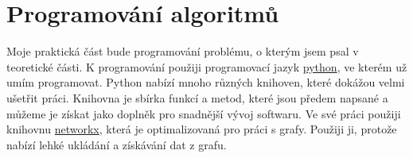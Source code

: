\chapter{Programování algoritmů}
\label{chap:programovani}

Moje praktická část bude programování problému, o kterým jsem psal v teoretické části. K programování použiji programovací jazyk \href{https://www.python.org/}{python}, ve kterém už umím programovat. Python nabízí mnoho různých knihoven, které dokážou velmi ušetřit práci. Knihovna je sbírka funkcí a metod, které jsou předem napsané a můžeme je získat jako doplněk pro snadnější vývoj softwaru. Ve své práci použiji knihovnu \href{https://networkx.org/}{networkx}, která je optimalizovaná pro práci s grafy. Použiji ji, protože nabízí lehké ukládání a získávání dat z grafu.




